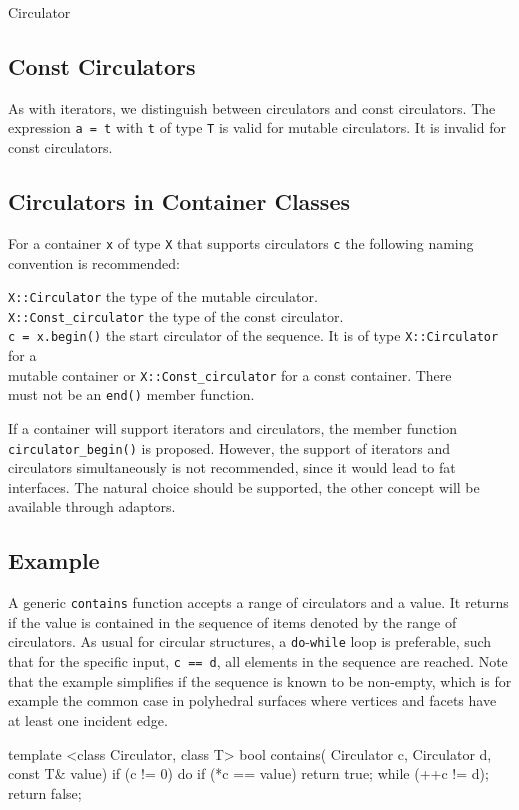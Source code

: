 \begin{ccRefConcept}{Circulator}
\subsection*{Const Circulators}

As with iterators, we distinguish between circulators and const
circulators. The expression {\tt *a = t} with {\tt t} of type {\tt T}
is valid for mutable circulators. It is invalid for const circulators.

\subsection*{Circulators in Container Classes}

For a container {\tt x} of type {\tt X} that supports circulators
{\tt c} the following naming convention is recommended:

\begin{tabbing}
    {\tt X::Circulator}  \> the type of the mutable circulator.\\
    {\tt X::Const\_circulator}  \> the type of the const circulator.\\
    {\tt c = x.begin()}         \> the start circulator of the sequence.
        It is of type {\tt X::Circulator} for a \\
      \> mutable container or {\tt X::Const\_circulator} for
         a const container. There \\ 
      \> must not be an {\tt end()} member function.
\end{tabbing}

If a container will support iterators and circulators, the member
function {\tt circulator\_begin()} is proposed. However, the support
of iterators and circulators simultaneously is not recommended, since
it would lead to fat interfaces. The natural choice should be
supported, the other concept will be available through adaptors.


\subsection*{Example}


A generic {\tt contains} function accepts a range of circulators and a
value. It returns  if the value is contained in the sequence
of items denoted by the range of circulators.  As usual for circular
structures, a {\tt do}-{\tt while} loop is preferable, such that for
the specific input, {\tt c == d}, all elements in the sequence are
reached. Note that the example simplifies if the sequence is known to
be non-empty, which is for example the common case in polyhedral
surfaces where vertices and facets have at least one incident edge.

\begin{ccExampleCode}
template <class Circulator, class T>
bool contains( Circulator c, Circulator d, const T& value) {
    if (c != 0) {
        do {
            if (*c == value)
                return true;
        } while (++c != d);
    }
    return false;
}
\end{ccExampleCode}

\end{ccRefConcept}

